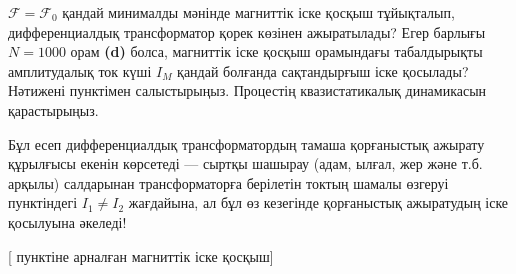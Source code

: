 \begin{task}
    \item $\mathcal F=\mathcal F_0$ қандай минималды мәнінде магниттік іске қосқыш тұйықталып, дифференциалдық трансформатор қорек көзінен ажыратылады? Егер барлығы $N=1000$ орам \textbf{(d)} болса, магниттік іске қосқыш орамындағы табалдырықты амплитудалық ток күші $I_M$ қандай болғанда сақтандырғыш іске қосылады? Нәтижені  пунктімен салыстырыңыз. Процестің квазистатикалық динамикасын қарастырыңыз.
\end{task}

Бұл есеп дифференциалдық трансформатордың тамаша қорғаныстық ажырату құрылғысы екенін көрсетеді --- сыртқы шашырау (адам, ылғал, жер және т.б. арқылы) салдарынан трансформаторға берілетін токтың шамалы өзгеруі  пунктіндегі $I_1\neq I_2$ жағдайына, ал бұл өз кезегінде қорғаныстық ажыратудың іске қосылуына әкеледі!

[ пунктіне арналған магниттік іске қосқыш]
